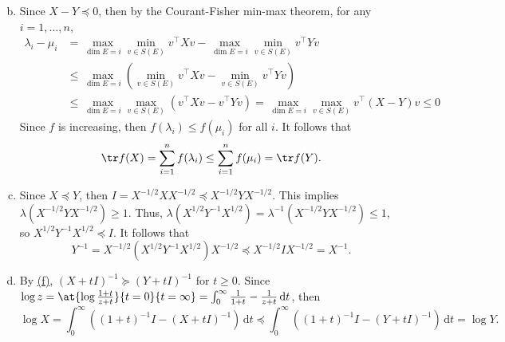 \begin{answer}
\begin{enumerate}[(a)]
\[		      \]
		\item Since \(X-Y \preceq 0\), then by the Courant-Fisher min-max theorem, for any \(i = 1,\dots,n\),
		      \[
			      \begin{split}
				      \lambda_i-\mu_i
				       & = \max_{\dim E=i}\min_{v\in S(E)}v^{\top} X v-\max_{\dim E=i}\min_{v\in S(E)} v^{\top} Y v      \\
				       & \leq \max_{\dim E=i} \left( \min_{v\in S(E)} v^{\top} X v - \min_{v\in S(E)}v^{\top}Y v \right) \\
				       & \leq \max_{\dim E=i}\max_{v\in S(E)} \left( v^{\top} X v - v^{\top} Y v \right)
				      = \max_{\dim E=i} \max_{v\in S(E)} v^{\top} (X-Y) v
				      \leq 0
			      \end{split}
		      \]
		      Since \(f\) is increasing, then \(f(\lambda_i)\leq f(\mu_i)\) for all \(i\). It follows that
		      \[
			      \tr f(X)
			      = \sum_{i=1}^{n} f(\lambda_i)
			      \leq \sum_{i=1}^{n} f(\mu_i)
			      =\tr f(Y).
		      \]
		\item Since \(X\preceq Y\), then \(I = X^{-1/2} X X^{-1/2} \preceq X^{-1/2} Y X^{-1/2}\). This implies \(\lambda(X^{-1/2} Y X^{-1/2}) \geq 1\). Thus, \(\lambda(X^{1/2} Y^{-1} X^{1/2}) = \lambda^{-1}(X^{-1/2} Y X^{-1/2})\leq 1\), so \(X^{1/2} Y^{-1} X^{1/2} \preceq I\). It follows that
		      \[
			      Y^{-1}
			      = X^{-1/2}(X^{1/2} Y^{-1} X^{1/2}) X^{-1/2}
			      \preceq X^{-1/2} I X^{-1/2}
			      = X^{-1}.
		      \]
		\item By \hyperref[ex5.4.5:f]{(f)}, \((X+tI)^{-1} \succeq (Y+tI)^{-1}\) for \(t \geq 0\). Since \(\log z = \at{\log \frac{1+t}{z+t}}{t = 0}{t = \infty } = \int_{0}^{\infty} \frac{1}{1+t} - \frac{1}{z+t} \,\mathrm{d} t\), then
		      \[
			      \log X
			      = \int_{0}^{\infty} ((1+t)^{-1} I - (X + tI)^{-1} ) \,\mathrm{d} t
			      \preceq \int_{0}^{\infty} ((1+t)^{-1}I-(Y+tI)^{-1}) \,\mathrm{d} t
			      = \log Y.
		      \]
	\end{enumerate}
\end{answer}

